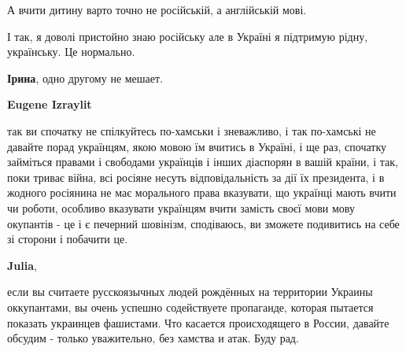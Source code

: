 \begin{itemize}
\begin{itemize}
 
А вчити дитину варто точно не російській, а англійській мові.

І так, я доволі пристойно знаю російську але в Україні я підтримую рідну, українську. Це нормально.


 
\textbf{Ірина}, одно другому не мешает.

 
\textbf{Eugene Izraylit} 

так ви спочатку не спілкуйтесь по-хамськи і зневажливо, і так по-хамські не
давайте порад українцям, якою мовою їм вчитись в Україні, і ще раз, спочатку
займіться правами і свободами українців і інших діаспорян в вашій країни, і
так, поки триває війна, всі росіяне несуть відповідальність за дії їх
президента, і в жодного росіянина не має морального права вказувати, що
українці мають вчити чи роботи, особливо вказувати українцям вчити замість
своєї мови мову окупантів - це і є печерний шовінізм, сподіваюсь, ви зможете
подивитись на себе зі сторони і побачити це.

 
\textbf{Julia}, 

если вы считаете русскоязычных людей рождённых на территории Украины
оккупантами, вы очень успешно содействуете пропаганде, которая пытается
показать украинцев фашистами. Что касается происходящего в России, давайте
обсудим - только уважительно, без хамства и атак. Буду рад.

 

\end{itemize}
\end{itemize}

